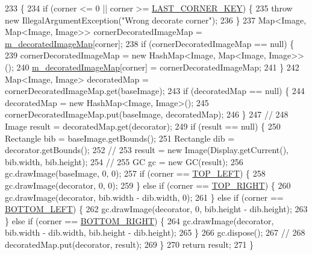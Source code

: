 \begin{DoxyCode}
233                                                                                                       \{
234         \textcolor{keywordflow}{if} (corner <= 0 || corner >= \hyperlink{classorg_1_1eclipse_1_1wb_1_1swt_1_1_s_w_t_resource_manager_a891f728f55d1d9a7bb4247674e0092d0}{LAST\_CORNER\_KEY}) \{
235             \textcolor{keywordflow}{throw} \textcolor{keyword}{new} IllegalArgumentException(\textcolor{stringliteral}{"Wrong decorate corner"});
236         \}
237         Map<Image, Map<Image, Image>> cornerDecoratedImageMap = 
      \hyperlink{classorg_1_1eclipse_1_1wb_1_1swt_1_1_s_w_t_resource_manager_a4afc391e22118550ae0a76f7fa168d18}{m\_decoratedImageMap}[corner];
238         \textcolor{keywordflow}{if} (cornerDecoratedImageMap == null) \{
239             cornerDecoratedImageMap = \textcolor{keyword}{new} HashMap<Image, Map<Image, Image>>();
240             \hyperlink{classorg_1_1eclipse_1_1wb_1_1swt_1_1_s_w_t_resource_manager_a4afc391e22118550ae0a76f7fa168d18}{m\_decoratedImageMap}[corner] = cornerDecoratedImageMap;
241         \}
242         Map<Image, Image> decoratedMap = cornerDecoratedImageMap.get(baseImage);
243         \textcolor{keywordflow}{if} (decoratedMap == null) \{
244             decoratedMap = \textcolor{keyword}{new} HashMap<Image, Image>();
245             cornerDecoratedImageMap.put(baseImage, decoratedMap);
246         \}
247         \textcolor{comment}{//}
248         Image result = decoratedMap.get(decorator);
249         \textcolor{keywordflow}{if} (result == null) \{
250             Rectangle bib = baseImage.getBounds();
251             Rectangle dib = decorator.getBounds();
252             \textcolor{comment}{//}
253             result = \textcolor{keyword}{new} Image(Display.getCurrent(), bib.width, bib.height);
254             \textcolor{comment}{//}
255             GC gc = \textcolor{keyword}{new} GC(result);
256             gc.drawImage(baseImage, 0, 0);
257             \textcolor{keywordflow}{if} (corner == \hyperlink{classorg_1_1eclipse_1_1wb_1_1swt_1_1_s_w_t_resource_manager_af08860b87174c2dd3f095c776040bcf8}{TOP\_LEFT}) \{
258                 gc.drawImage(decorator, 0, 0);
259             \} \textcolor{keywordflow}{else} \textcolor{keywordflow}{if} (corner == \hyperlink{classorg_1_1eclipse_1_1wb_1_1swt_1_1_s_w_t_resource_manager_a024b59862eb3bc6eec12dd2bec92c1e5}{TOP\_RIGHT}) \{
260                 gc.drawImage(decorator, bib.width - dib.width, 0);
261             \} \textcolor{keywordflow}{else} \textcolor{keywordflow}{if} (corner == \hyperlink{classorg_1_1eclipse_1_1wb_1_1swt_1_1_s_w_t_resource_manager_a4f0d49da071dc4f1b575de93e27c074c}{BOTTOM\_LEFT}) \{
262                 gc.drawImage(decorator, 0, bib.height - dib.height);
263             \} \textcolor{keywordflow}{else} \textcolor{keywordflow}{if} (corner == \hyperlink{classorg_1_1eclipse_1_1wb_1_1swt_1_1_s_w_t_resource_manager_ae0ed56ec45ea09895f7fba82814622d0}{BOTTOM\_RIGHT}) \{
264                 gc.drawImage(decorator, bib.width - dib.width, bib.height - dib.height);
265             \}
266             gc.dispose();
267             \textcolor{comment}{//}
268             decoratedMap.put(decorator, result);
269         \}
270         \textcolor{keywordflow}{return} result;
271     \}
\end{DoxyCode}

